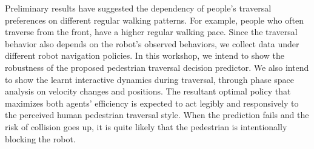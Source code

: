 \documentclass[conference]{IEEEtran}
\begin{document}
Preliminary results have suggested the dependency of people's traversal preferences 
on different regular walking patterns. For example, people who often traverse from 
the front, have a higher regular walking pace. Since the traversal 
behavior also depends on the robot's observed behaviors, we collect data under 
different robot navigation policies. In this workshop, we intend to show the 
robustness of the proposed pedestrian traversal decision predictor. We also 
intend to show the learnt interactive dynamics during traversal, through phase 
space analysis on velocity changes and positions. The resultant optimal 
policy that maximizes both agents' efficiency is expected to act legibly 
and responsively to the perceived human pedestrian traversal style. When the 
prediction fails and the risk of collision goes up, it is quite likely that 
the pedestrian is intentionally blocking the robot.
\vspace{-0.1em}
{\footnotesize


}
\end{document}
